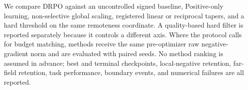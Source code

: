 We compare DRPO against an uncontrolled signed baseline, Positive-only learning, non-selective global scaling, registered linear or reciprocal tapers, and a hard threshold on the same remoteness coordinate. A quality-based hard filter is reported separately because it controls a different axis. Where the protocol calls for budget matching, methods receive the same pre-optimizer raw negative-gradient norm and are evaluated with paired seeds. No method ranking is assumed in advance; best and terminal checkpoints, local-negative retention, far-field retention, task performance, boundary events, and numerical failures are all reported.
